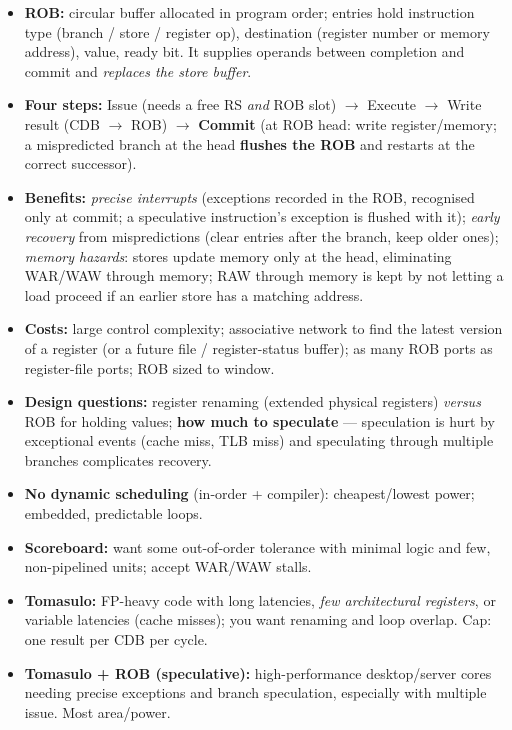 \begin{itemize}
\item \textbf{ROB:} circular buffer allocated in program order; entries hold instruction type (branch / store / register op), destination (register number or memory address), value, ready bit. It supplies operands between completion and commit and \emph{replaces the store buffer}.
\item \textbf{Four steps:} Issue (needs a free RS \emph{and} ROB slot) $\rightarrow$ Execute $\rightarrow$ Write result (CDB $\rightarrow$ ROB) $\rightarrow$ \textbf{Commit} (at ROB head: write register/memory; a mispredicted branch at the head \textbf{flushes the ROB} and restarts at the correct successor).
\item \textbf{Benefits:} \emph{precise interrupts} (exceptions recorded in the ROB, recognised only at commit; a speculative instruction's exception is flushed with it); \emph{early recovery} from mispredictions (clear entries after the branch, keep older ones); \emph{memory hazards}: stores update memory only at the head, eliminating WAR/WAW through memory; RAW through memory is kept by not letting a load proceed if an earlier store has a matching address.
\item \textbf{Costs:} large control complexity; associative network to find the latest version of a register (or a future file / register-status buffer); as many ROB ports as register-file ports; ROB sized to window.
\item \textbf{Design questions:} register renaming (extended physical registers) \emph{versus} ROB for holding values; \textbf{how much to speculate} --- speculation is hurt by exceptional events (cache miss, TLB miss) and speculating through multiple branches complicates recovery.
\end{itemize}

\begin{dec}
\begin{itemize}
\item \textbf{No dynamic scheduling} (in-order + compiler): cheapest/lowest power; embedded, predictable loops.
\item \textbf{Scoreboard:} want some out-of-order tolerance with minimal logic and few, non-pipelined units; accept WAR/WAW stalls.
\item \textbf{Tomasulo:} FP-heavy code with long latencies, \emph{few architectural registers}, or variable latencies (cache misses); you want renaming and loop overlap. Cap: one result per CDB per cycle.
\item \textbf{Tomasulo + ROB (speculative):} high-performance desktop/server cores needing precise exceptions and branch speculation, especially with multiple issue. Most area/power.
\end{itemize}
\end{dec}

